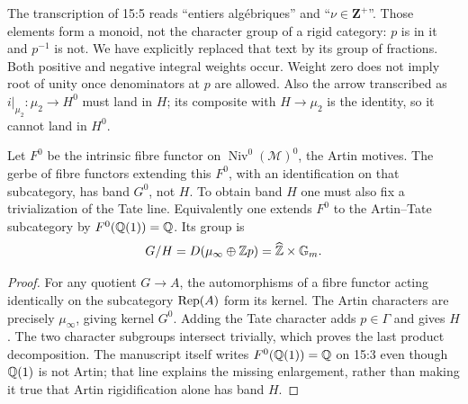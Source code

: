 \begin{remark}
\label{A:monoid}
The transcription of 15:5 reads ``entiers alg\'ebriques'' and
``$\nu\in\mathbf Z^+$''. Those elements form a monoid, not the
character group of a rigid category: $p$ is in it and $p^{-1}$ is not.
We have explicitly replaced that text by its group of fractions.
Both positive and negative integral weights occur. Weight zero does
not imply root of unity once denominators at $p$ are allowed.
Also the arrow transcribed as $i|_{\mu_2}:\mu_2\to H^0$ must land
in $H$; its composite with $H\to\mu_2$ is the identity, so it
cannot land in $H^0$.
\end{remark}

\begin{proposition}
\label{A:rigidification}
Let $F^0$ be the intrinsic fibre functor on
$\operatorname{Niv}^0(\mathcal M)^0$, the Artin motives. The gerbe
of fibre functors extending this $F^0$, with an identification on
that subcategory, has band $G^0$, not $H$. To obtain band $H$ one
must also fix a trivialization of the Tate line. Equivalently one
extends $F^0$ to the Artin--Tate subcategory by $F^0(\mathbb Q(1))=\mathbb Q$.
Its group is
\[
 G/H=D(\mu_\infty\oplus\mathbb Z p)
          =\widehat{\mathbb Z}\times{\mathbb G_m}.
\]
\end{proposition}
\begin{proof}
For any quotient $G\to A$, the automorphisms of a fibre functor
acting identically on the subcategory $\operatorname{Rep}(A)$ form its kernel.
The Artin characters are precisely $\mu_\infty$, giving kernel
$G^0$. Adding the Tate character adds $p\in\Gamma$ and gives $H$.
The two character subgroups intersect trivially, which proves the
last product decomposition. The manuscript itself writes
$F^0(\mathbb Q(1))=\mathbb Q$ on 15:3 even though $\mathbb Q(1)$ is not Artin; that
line explains the missing enlargement, rather than making it true
that Artin rigidification alone has band $H$.
\end{proof}

